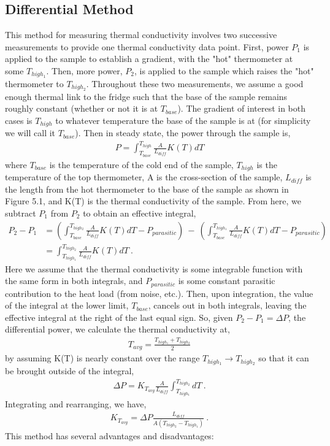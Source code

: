 \documentclass{report}
\begin{document}
\subsection{Differential Method}
This method for measuring thermal conductivity involves two successive measurements to provide one thermal conductivity data point. First, power $P_1$ is applied to the sample to establish a gradient, with the "hot" thermometer at some $T_{high_1}$. Then, more power, $P_2$, is applied to the sample which raises the "hot" thermometer to $T_{high_2}$. Throughout these two measurements, we assume a good enough thermal link to the fridge such that the base of the sample remains roughly constant (whether or not it is at $T_{base}$). The gradient of interest in both cases is $T_{high}$ to whatever temperature the base of the sample is at (for simplicity we will call it $T_{base}$). Then in steady state, the power through the sample is,
\begin{eqnarray}
P = \int_{T_{base}}^{T_{high}} \frac{A}{L_{diff}}K(T)dT
\end{eqnarray}
where $T_{base}$ is the temperature of the cold end of the sample, $T_{high}$ is the temperature of the top thermometer, A is the cross-section of the sample, $L_{diff}$ is the length from the hot thermometer to the base of the sample as shown in Figure 5.1, and K(T) is the thermal conductivity of the sample. From here, we subtract $P_1$ from $P_2$ to obtain an effective integral,
\begin{equation}
    \begin{aligned}
P_2 - P_1 & = \left(\int_{T_{base}}^{T_{high_2}} \frac{A}{L_{diff}} K(T)dT - P_{parasitic}\right) \ - \ \left(\int_{T_{base}}^{T_{high_1}} \frac{A}{L_{diff}} K(T)dT - P_{parasitic}\right) \\
& = \int_{T_{high_1}}^{T_{high_2}} \frac{A}{L_{diff}} K(T)dT \ .
    \end{aligned}
\end{equation}
Here we assume that the thermal conductivity is some integrable function with the same form in both integrals, and $P_{parasitic}$ is some constant parasitic contribution to the heat load (from noise, etc.). Then, upon integration, the value of the integral at the lower limit, $T_{base}$, cancels out in both integrals, leaving the effective integral at the right of the last equal sign. So, given $P_2 - P_1 = \Delta P$, the differential power, we calculate the thermal conductivity at,
\begin{eqnarray}
T_{avg} = \frac{T_{high_1} + T_{high_2}}{2}
\end{eqnarray}
by assuming K(T) is nearly constant over the range $T_{high_1} \rightarrow T_{high_2}$ so that it can be brought outside of the integral,
\begin{eqnarray}
\Delta P = K_{T_{avg}}\frac{A}{L_{diff}}\int_{T_{high_1}}^{T_{high_2}}dT \ .
\end{eqnarray}
Integrating and rearranging, we have,
\begin{eqnarray}
K_{T_{avg}} = \Delta P\frac{L_{diff}}{A(T_{high_2}-T_{high_1})} \ .
\end{eqnarray}
This method has several advantages and disadvantages:
\bigskip
\end{document}
